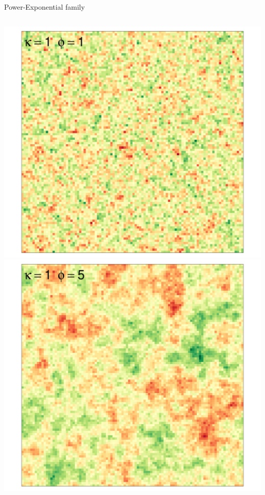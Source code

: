 \documentclass[
  ignorenonframetext,
]{beamer}
\begin{document}
\begin{frame}{Power-Exponential family}
\small

\begin{columns}[T]
\begin{column}{0.33\textwidth}
\includegraphics{Lecture_1_files/figure-beamer/unnamed-chunk-11-1.pdf}
\includegraphics{Lecture_1_files/figure-beamer/unnamed-chunk-12-1.pdf}
\end{column}


\end{columns}
\end{frame}
\end{document}
